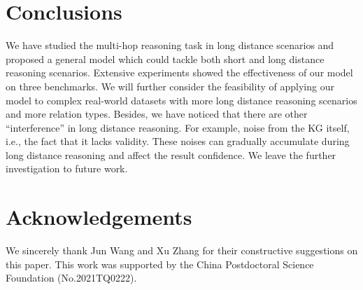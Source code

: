 \section{Conclusions}
\label{sec:conclusions}

We have studied the multi-hop reasoning task in long distance scenarios and proposed a general model which could tackle both short and long distance reasoning scenarios.
Extensive experiments showed the effectiveness of our model on three benchmarks.
We will further consider the feasibility of applying our model to complex real-world datasets with more long distance reasoning scenarios and more relation types.
Besides, we have noticed that there are other ``interference'' in long distance reasoning. For example, noise from the KG itself, i.e., the fact that it lacks validity. These noises can gradually accumulate during long distance reasoning and affect the result confidence. We leave the further investigation to future work.


\section{Acknowledgements} 
    We sincerely thank Jun Wang and Xu Zhang for their constructive suggestions on this paper.
    This work was supported by the China Postdoctoral Science Foundation (No.2021TQ0222).